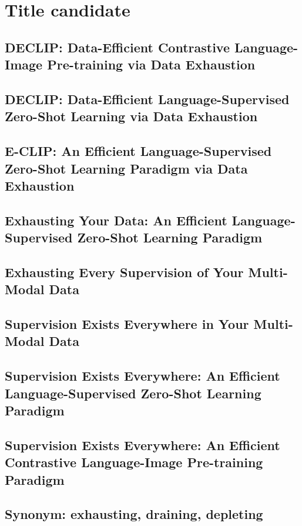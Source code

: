 \section{Title candidate}
\subsection{DECLIP: Data-Efficient Contrastive Language-Image Pre-training via Data Exhaustion}
\subsection{DECLIP: Data-Efficient Language-Supervised Zero-Shot Learning via Data Exhaustion}
\subsection{E-CLIP: An Efficient Language-Supervised Zero-Shot Learning Paradigm via Data Exhaustion}
\subsection{Exhausting Your Data: An Efficient Language-Supervised Zero-Shot Learning Paradigm}
\subsection{Exhausting Every Supervision of Your Multi-Modal Data}
\subsection{Supervision Exists Everywhere in Your Multi-Modal Data}
\subsection{Supervision Exists Everywhere: An Efficient Language-Supervised Zero-Shot Learning Paradigm}
\subsection{Supervision Exists Everywhere: An Efficient Contrastive Language-Image Pre-training Paradigm}
\subsection{Synonym: exhausting, draining, depleting}